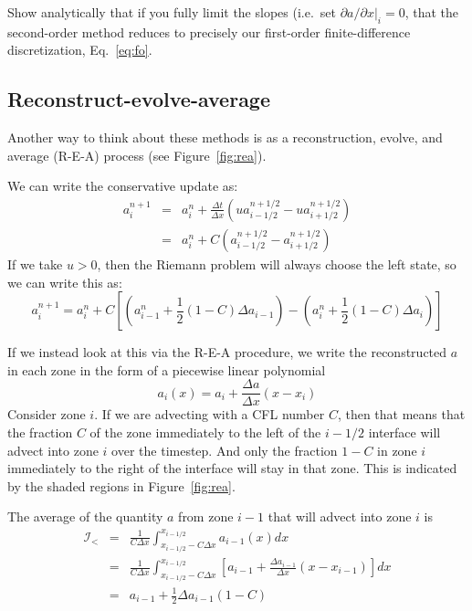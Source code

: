 \begin{exercise}
{Show analytically that if you fully limit the slopes
  (i.e.\ set $\partial a/\partial x |_i = 0$, that the second-order
  method reduces to precisely our first-order finite-difference discretization,
  Eq.~\ref{eq:fo}.  }
\end{exercise}


\subsection{Reconstruct-evolve-average}

Another way to think about these methods is as a reconstruction,
evolve, and average (R-E-A) process (see Figure~\ref{fig:rea}).  

We can write the conservative update as:
\begin{eqnarray}
a_i^{n+1} &=& a_i^n + \frac{\Delta t}{\Delta x} 
    (u a^{n+1/2}_{i-1/2} - u a^{n+1/2}_{i+1/2} ) \\
          &=& a_i^n + C (a^{n+1/2}_{i-1/2} - a^{n+1/2}_{i+1/2} ) 
\end{eqnarray}
If we take $u > 0$, then the Riemann problem will always choose the
left state, so we can write this as:
\begin{equation}
a_i^{n+1} = a_i^n + 
     C \left [\left (a_{i-1}^n + \frac{1}{2} (1-C) \Delta a_{i-1} \right ) -
              \left (a_{i}^n + \frac{1}{2} (1-C) \Delta a_{i} \right ) 
       \right ] \label{eq:rea_orig}
\end{equation}

If we instead look at this via the R-E-A procedure, we write the reconstructed
$a$ in each zone in the form of a piecewise linear polynomial
\begin{equation}
a_i(x) = a_i + \frac{\Delta a}{\Delta x} (x - x_i)
\end{equation}
Consider zone $i$.  
If we are advecting with a CFL number $C$, then that means that the fraction
$C$ of the zone immediately to the left of the $i-1/2$ interface will advect
into zone $i$ over the timestep.  And only the fraction $1-C$ in zone $i$
immediately to the right of the interface will stay in that zone.  This 
is indicated by the shaded regions in Figure~\ref{fig:rea}. 

The average of the quantity $a$ from zone $i-1$ that will advect into
zone $i$ is 
\begin{eqnarray}
\mathcal{I}_< &=& \frac{1}{C \Delta x} 
   \int_{x_{i-1/2} - C\Delta x}^{x_{i-1/2}} a_{i-1}(x) dx \\
%
 &=& \frac{1}{C \Delta x} 
   \int_{x_{i-1/2} - C\Delta x}^{x_{i-1/2}}
        \left [ a_{i-1} + \frac{\Delta a_{i-1}}{\Delta x} (x - x_{i-1} ) \right ] dx  \\
 &=& a_{i-1} + \frac{1}{2} \Delta a_{i-1} (1-C)
\end{eqnarray}

